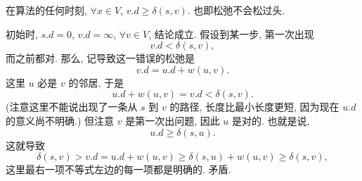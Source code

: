 \documentclass[a4paper]{ctexart}
\theoremstyle{definition}
\theoremstyle{definition}
\begin{document}

 在算法的任何时刻, $\forall x \in V$,
$v.d \geq \delta(s, v)$. 也即松弛不会松过头. 

 初始时, $s.d = 0$, $v.d = \infty$, $\forall v \in V$,
结论成立. 假设到某一步, 第一次出现
$$
v.d < \delta(s, v),
$$
而之前都对. 那么, 记导致这一错误的松弛是
$$
v.d = u.d + w(u, v).
$$
这里 $u$ 必是 $v$ 的邻居, 于是
$$
u.d + w(u, v) = v.d < \delta(s, v).
$$
(注意这里不能说出现了一条从 $s$ 到 $v$ 的路径, 长度比最小长度更短, 因为现在 $u.d$ 的意义尚不明确.)
但注意 $v$ 是第一次出问题, 因此 $u$ 是对的. 也就是说,
$$
u.d \geq \delta(s, u).
$$
这就导致
$$
\delta(s, v) > v.d = u.d + w(u, v) \geq \delta(s, u) + w(u, v) \geq \delta(s, v), 
$$
这里最右一项不等式左边的每一项都是明确的. 矛盾.
\end{document}

